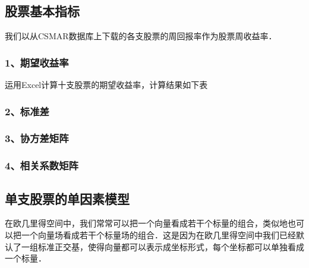 
\subsection{股票基本指标}
我们以从CSMAR数据库上下载的各支股票的周回报率作为股票周收益率．
\subsubsection{1、期望收益率}
运用Excel计算十支股票的期望收益率，计算结果如下表

\subsubsection{2、标准差}
\subsubsection{3、协方差矩阵}
\subsubsection{4、相关系数矩阵}

\subsection{单支股票的单因素模型}
在欧几里得空间中，我们常常可以把一个向量看成若干个标量的组合，类似地也可以把一个向量场看成若干个标量场的组合．这是因为在欧几里得空间中我们已经默认了一组标准正交基，使得向量都可以表示成坐标形式，每个坐标都可以单独看成一个标量．